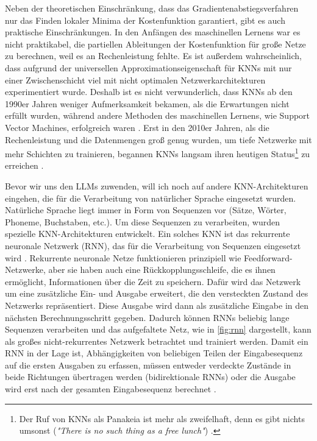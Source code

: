 Neben der theoretischen Einschränkung, dass das Gradientenabstiegsverfahren nur das Finden lokaler Minima der Kostenfunktion garantiert, gibt es auch praktische Einschränkungen.
In den Anfängen des maschinellen Lernens war es nicht praktikabel, die partiellen Ableitungen der Kostenfunktion für große Netze zu berechnen, weil es an Rechenleistung fehlte.
Es ist außerdem wahrscheinlich, dass aufgrund der universellen Approximationseigenschaft für KNNs mit nur einer Zwischenschicht viel mit nicht optimalen Netzwerkarchitekturen experimentiert wurde.
Deshalb ist es nicht verwunderlich, dass KNNs ab den 1990er Jahren weniger Aufmerksamkeit bekamen, als die Erwartungen nicht erfüllt wurden, während andere Methoden des maschinellen Lernens, wie \foreignlanguage{english}{Support Vector Machines}, erfolgreich waren \cite{Schmidhuber2015}.
Erst in den 2010er Jahren, als die Rechenleistung und die Datenmengen groß genug wurden, um tiefe Netzwerke mit mehr Schichten zu trainieren, begannen KNNs langsam ihren heutigen Status\footnote{Der Ruf von KNNs als Panakeia ist mehr als zweifelhaft, denn \glqq es gibt nichts umsonst\grqq{} (\textit{\foreignlanguage{english}{"There is no such thing as a free lunch"}}) \cite{NoFreeLunch}.} zu erreichen \cite{Schmidhuber2015}.

Bevor wir uns den LLMs zuwenden, will ich noch auf andere KNN-Architekturen eingehen, die für die Verarbeitung von natürlicher Sprache eingesetzt wurden.
Natürliche Sprache liegt immer in Form von Sequenzen vor (Sätze, Wörter, Phoneme, Buchstaben, etc.).
Um diese Sequenzen zu verarbeiten, wurden spezielle KNN-Architekturen entwickelt.
Ein solches KNN ist das rekurrente neuronale Netzwerk (RNN), das für die Verarbeitung von Sequenzen eingesetzt wird \cite{bidirectional_rnn}.
Rekurrente neuronale Netze funktionieren prinzipiell wie Feedforward-Netzwerke, aber sie haben auch eine Rückkopplungsschleife, die es ihnen ermöglicht, Informationen über die Zeit zu speichern.
Dafür wird das Netzwerk um eine zusätzliche Ein- und Ausgabe erweitert, die den versteckten Zustand des Netzwerks repräsentiert.
Diese Ausgabe wird dann als zusätzliche Eingabe in den nächsten Berechnungsschritt gegeben.
Dadurch können RNNs beliebig lange Sequenzen verarbeiten und das \glqq aufgefaltete\grqq{} Netz, wie in \ref{fig:rnn} dargestellt, kann als großes nicht-rekurrentes Netzwerk betrachtet und trainiert werden.
Damit ein RNN in der Lage ist, Abhängigkeiten von beliebigen Teilen der Eingabesequenz auf die ersten Ausgaben zu erfassen, müssen entweder verdeckte Zustände in beide Richtungen übertragen werden (bidirektionale RNNs) oder die Ausgabe wird erst nach der gesamten Eingabesequenz berechnet \cite{bidirectional_rnn}.

